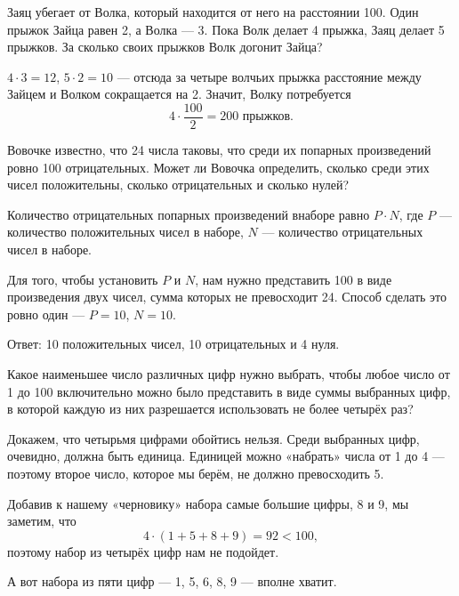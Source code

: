 

\begin{itemize}

	\def\metr#1{\SI{#1}{\text{м}}}
	\itA Заяц убегает от Волка, который находится от него на расстоянии \metr{100}. Один прыжок Зайца равен \metr{2}, а Волка — \metr{3}. Пока Волк делает 4 прыжка, Заяц делает 5 прыжков. За сколько своих прыжков Волк догонит Зайца?
	
	\itr $4 \cdot 3 = 12$, $5 \cdot 2 = 10$ — отсюда за четыре волчьих прыжка расстояние между Зайцем и Волком сокращается на \metr{2}. Значит, Волку потребуется
	$$4 \cdot \frac{100}{2} = 200\text{ прыжков.}$$
	
	\itB Вовочке известно, что 24 числа таковы, что среди их попарных произведений ровно 100 отрицательных. Может ли Вовочка определить, сколько среди этих чисел положительны, сколько отрицательных и сколько нулей?
	
	\itr Количество отрицательных попарных произведений в\linebreak наборе равно $P \cdot N$, где $P$ — количество положительных чисел в наборе, $N$ — количество отрицательных чисел в наборе.
	
	Для того, чтобы установить $P$ и $N$, нам нужно представить 100 в виде произведения двух чисел, сумма которых не превосходит 24. Способ сделать это ровно один — $P=10$, $N=10$.
	
	Ответ: 10 положительных чисел, 10 отрицательных и 4 нуля.
	
	\itC Какое наименьшее число различных цифр нужно выбрать, чтобы любое число от 1 до 100 включительно можно было представить в виде суммы выбранных цифр, в которой каждую из них разрешается использовать не более четырёх раз?
	
	\itr Докажем, что четырьмя цифрами обойтись нельзя. Среди выбранных цифр, очевидно, должна быть единица. Единицей можно «набрать» числа от 1 до 4 — поэтому второе число, которое мы берём, не должно превосходить 5.
	
	Добавив к нашему «черновику» набора самые большие цифры, 8 и 9, мы заметим, что
	$$4 \cdot (1+5+8+9) = 92 < 100,$$
	поэтому набор из четырёх цифр нам не подойдет.
	
	А вот набора из пяти цифр — 1, 5, 6, 8, 9 — вполне хватит.

\end{itemize}


